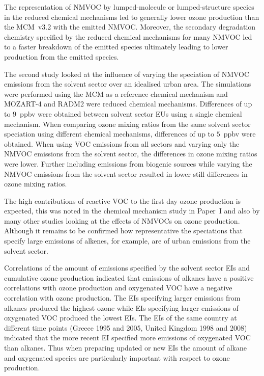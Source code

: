 The representation of NMVOC by lumped-molecule or lumped-structure species in the reduced chemical mechanisms led to generally lower ozone production than the MCM~v3.2 with the emitted NMVOC.
Moreover, the secondary degradation chemistry specified by the reduced chemical mechanisms for many NMVOC led to a faster breakdown of the emitted species ultimately leading to lower  production from the emitted species.

The second study looked at the influence of varying the speciation of NMVOC emissions from the solvent sector over an idealised urban area.
The simulations were performed using the MCM as a reference chemical mechanism and MOZART-4 and RADM2 were reduced chemical mechanisms.
Differences of up to $9$~ppbv were obtained between solvent sector EUs using a single chemical mechanism.
When comparing ozone mixing ratios from the same solvent sector speciation using different chemical mechanisms, differences of up to $5$~ppbv were obtained.
When using VOC emissions from all sectors and varying only the NMVOC emissions from the solvent sector, the differences in ozone mixing ratios were lower.
Further including emissions from biogenic sources while varying the NMVOC emissions from the solvent sector resulted in lower still differences in ozone mixing ratios.

The high contributions of reactive VOC to the first day ozone production is expected, this was noted in the chemical mechanism study in Paper~I and also by many other studies looking at the effects of NMVOCs on ozone production.
Although it remains to be confirmed how representative the speciations that specify large emissions of alkenes, for example, are of urban emissions from the solvent sector.

Correlations of the amount of emissions specified by the solvent sector EIs and cumulative ozone production indicated that emissions of alkanes have a positive correlations with ozone production and oxygenated VOC have a negative correlation with ozone production.
The EIs specifying larger emissions from alkanes produced the highest ozone while EIs specifying larger emissions of oxygenated VOC produced the lowest EIs.
The EIs of the same country at different time points (Greece 1995 and 2005, United Kingdom 1998 and 2008) indicated that the more recent EI specified more emissions of oxygenated VOC than alkanes.
Thus when preparing updated or new EIs the amount of alkane and oxygenated species are particularly important with respect to ozone production.

